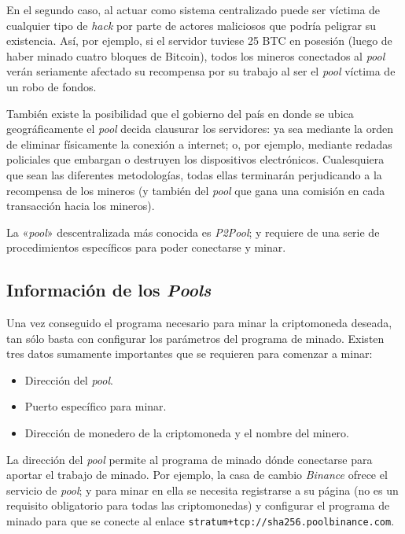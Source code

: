 \documentclass[12pt,a4paper,twoside]{book}
\begin{document}
En el segundo caso, al actuar como sistema centralizado puede ser víctima de cualquier tipo de \textit{hack} por parte de actores maliciosos que podría peligrar su existencia. Así, por ejemplo, si el servidor tuviese 25 BTC en posesión (luego de haber minado cuatro bloques de Bitcoin), todos los mineros conectados al \textit{pool} verán seriamente afectado su recompensa por su trabajo al ser el \textit{pool} víctima de un robo de fondos.

También existe la posibilidad que el gobierno del país en donde se ubica geográficamente el \textit{pool} decida clausurar los servidores: ya sea mediante la orden de eliminar físicamente la conexión a internet; o, por ejemplo, mediante redadas policiales que embargan o destruyen los dispositivos electrónicos. Cualesquiera que sean las diferentes metodologías, todas ellas terminarán perjudicando a la recompensa de los mineros (y también del \textit{pool} que gana una comisión en cada transacción hacia los mineros).

La «\textit{pool}» descentralizada más conocida es \textit{P2Pool}; y requiere de una serie de procedimientos específicos para poder conectarse y minar.

\subsection{Información de los \textit{Pools}}
Una vez conseguido el programa necesario para minar la criptomoneda deseada, tan sólo basta con configurar los parámetros del programa de minado. Existen tres datos sumamente importantes que se requieren para comenzar a minar:

\begin{itemize}
\item Dirección del \textit{pool}.
\item Puerto específico para minar.
\item Dirección de monedero de la criptomoneda y el nombre del minero.
\end{itemize}

La dirección del \textit{pool} permite al programa de minado dónde conectarse para aportar el trabajo de minado. Por ejemplo, la casa de cambio \textit{Binance} ofrece el servicio de \textit{pool}; y para minar en ella se necesita registrarse a su página (no es un requisito obligatorio para todas las criptomonedas) y configurar el programa de minado para que se conecte al enlace \texttt{stratum+tcp://sha256.poolbinance.com}.
\end{document}
